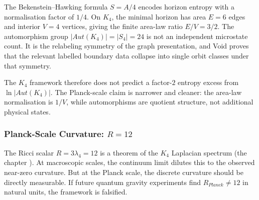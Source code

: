 \documentclass[11pt,a4paper]{book}
\def\text#1{#1}%
\begin{document}
The Bekenstein--Hawking formula $S = A/4$ encodes horizon entropy with a normalisation factor of $1/4$. On $K_4$, the minimal horizon has area $E = 6$ edges and interior $V = 4$ vertices, giving the finite area-law ratio $E/V = 3/2$. The automorphism group $|Aut(K_4)| = |S_4| = 24$ is not an independent microstate count. It is the relabeling symmetry of the graph presentation, and Void proves that the relevant labelled boundary data collapse into single orbit classes under that symmetry.

The $K_4$ framework therefore does not predict a factor-$2$ entropy excess from $\ln|Aut(K_4)|$. The Planck-scale claim is narrower and cleaner: the area-law normalisation is $1/V$, while automorphisms are quotient structure, not additional physical states.

\subsubsection*{Planck-Scale Curvature: $R = 12$}

The Ricci scalar $R = 3\lambda_4 = 12$ is a theorem of the $K_4$ Laplacian spectrum (the chapter \emph{}). At macroscopic scales, the continuum limit dilutes this to the observed near-zero curvature. But at the Planck scale, the discrete curvature should be directly measurable. If future quantum gravity experiments find $R_{\text{Planck}} \ne 12$ in natural units, the framework is falsified.
\end{document}
